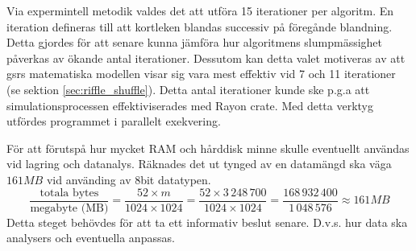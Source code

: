 \documentclass[swedish,a4paper]{article}
\begin{document}

Via expermintell metodik valdes det att utföra 15 iterationer
per algoritm. En iteration defineras till att kortleken blandas successiv på
föregånde blandning. Detta gjordes 
för att senare kunna jämföra hur algoritmens slumpmässighet påverkas av ökande 
antal iterationer. Dessutom kan detta valet motiveras av att \gls{gsr}s matematiska
modellen visar sig vara mest effektiv vid 7 och 11 iterationer (se sektion
\ref{sec:riffle_shuffle}). Detta antal iterationer kunde
ske p.g.a att simulationsprocessen effektiviserades med Rayon \gls{crate}.
Med detta verktyg utfördes programmet i parallelt exekvering. 

För att förutspå hur mycket RAM och hårddisk minne  skulle eventuellt användas vid
lagring och datanalys. Räknades det ut tynged av en datamängd ska väga 
$161 MB$ vid använding av 8bit datatypen.
$$ \frac{\text{totala bytes}}{\text{megabyte (MB)}} = \frac{52 \times m }{1024 \times
1024} = \frac{52 \times 3\,248\,700}{1024 \times 1024} = \frac{168\,932\,400}{1\,048\,576} \approx 161 MB 
$$
Detta steget behövdes för att ta ett informativ beslut senare. D.v.s. hur data ska
analysers och eventuella anpassas.
\end{document}
